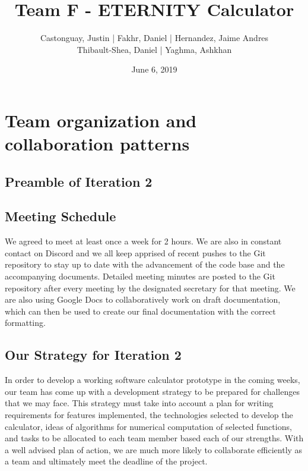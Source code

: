 \documentclass[a4paper]{article}
\begin{document}
\title{\LARGE{\textbf{Team F - ETERNITY Calculator}}}
\author{
	Castonguay, Justin | Fakhr, Daniel | Hernandez, Jaime Andres \\ Thibault-Shea, Daniel |
	Yaghma, Ashkhan \\
}
\date{June 6, 2019}

\fancyhf{}

\clearpage\maketitle
\thispagestyle{empty} %
\pagebreak

\setcounter{page}{2} %
\fancyhf{}
\renewcommand{\headrulewidth}{2pt}
\renewcommand{\footrulewidth}{1pt}
\fancyhead[LE,RO]{\rightmark}
\tableofcontents
\pagebreak




\section{Team organization and collaboration patterns}

\subsection{Preamble of Iteration 2}

\subsection{Meeting Schedule}

We agreed to meet at least once a week for 2 hours. We are also in constant contact on Discord and we all keep apprised of recent pushes to the Git repository to stay up to date with the advancement of the code base and the accompanying documents. Detailed meeting minutes are posted to the Git repository after every meeting by the designated secretary for that meeting. We are also using Google Docs to collaboratively work on draft documentation, which can then be used to create our final documentation with the correct formatting.

\subsection{Our Strategy for Iteration 2}

In order to develop a working software calculator prototype in the coming weeks, our team has come up with a development strategy to be prepared for challenges that we may face. This strategy must take into account a plan for writing requirements for features implemented, the technologies selected to develop the calculator, ideas of algorithms for numerical computation of selected functions, and tasks to be allocated to each team member based each of our strengths. With a well advised plan of action, we are much more likely to collaborate efficiently as a team and ultimately meet the deadline of the project. 
\end{document}
